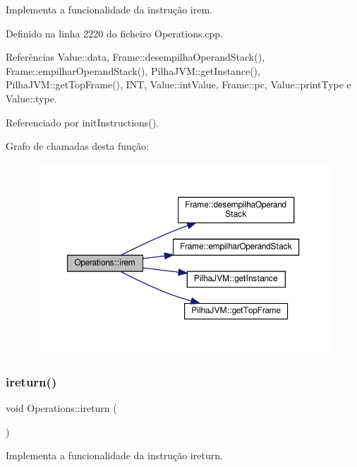 Implementa a funcionalidade da instrução irem. 



Definido na linha 2220 do ficheiro Operations.\+cpp.



Referências Value\+::data, Frame\+::desempilha\+Operand\+Stack(), Frame\+::empilhar\+Operand\+Stack(), Pilha\+J\+V\+M\+::get\+Instance(), Pilha\+J\+V\+M\+::get\+Top\+Frame(), I\+NT, Value\+::int\+Value, Frame\+::pc, Value\+::print\+Type e Value\+::type.



Referenciado por init\+Instructions().

Grafo de chamadas desta função\+:\nopagebreak
\begin{figure}[H]
\begin{center}
\leavevmode
\includegraphics[width=350pt]{classOperations_a510bd2d155695861597a4413b44565bc_cgraph}
\end{center}
\end{figure}
\mbox{\label{classOperations_a4be12fb7c8eeee8a2f6489ec27a46dce}} 
\subsubsection{\texorpdfstring{ireturn()}{ireturn()}}
{\footnotesize\ttfamily void Operations\+::ireturn (\begin{DoxyParamCaption}{ }\end{DoxyParamCaption})\hspace{0.3cm}{\ttfamily [private]}}



Implementa a funcionalidade da instrução ireturn. 



